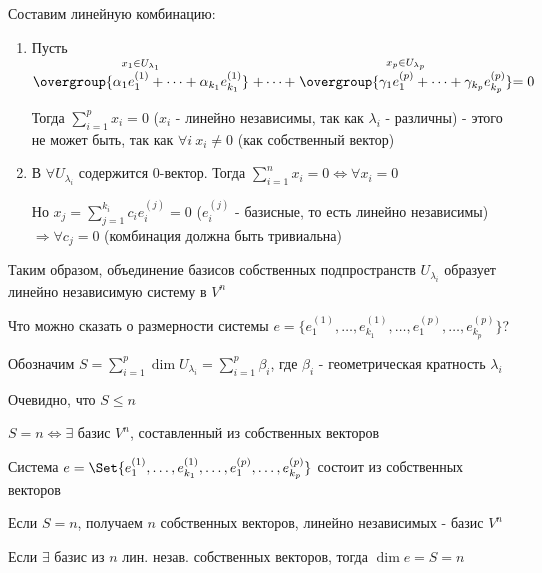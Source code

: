 \documentclass[12pt]{article}
\begin{document}
    \begin{MyProof}
        Составим линейную комбинацию:

        \begin{enumerate}
            \item Пусть $\stackrel{x_1 \in U_{\lambda_1}}{\overgroup{\alpha_1 e^{(1)}_1 + \dots + \alpha_{k_1} e^{(1)}_{k_1}}} + \dots +
            \stackrel{x_p \in U_{\lambda_p}}{\overgroup{\gamma_1 e^{(p)}_1 + \dots + \gamma_{k_p} e^{(p)}_{k_p}}} = 0$

            Тогда $\sum_{i=1}^p x_i = 0$ ($x_i$ - линейно независимы, так как $\lambda_i$ - различны) - этого не может быть, так как $\forall i \ x_i \neq 0$ (как собственный вектор)

            \item В $\forall U_{\lambda_i}$ содержится $0$-вектор. Тогда $\sum_{i=1}^n x_i = 0 \Longleftrightarrow \forall x_i = 0$

            Но $x_j = \sum_{j=1}^{k_i} c_i e^{(j)}_i = 0$ ($e^{(j)}_i$ - базисные, то есть линейно независимы) $\Longrightarrow \forall c_j = 0$ (комбинация должна быть тривиальна)
        \end{enumerate}
    \end{MyProof}

    \Nota Таким образом, объединение базисов собственных подпространств $U_{\lambda_i}$ образует линейно независимую систему в $V^n$

    Что можно сказать о размерности системы $e = \{e^{(1)}_1, \dots, e^{(1)}_{k_1}, \dots, e^{(p)}_1, \dots, e^{(p)}_{k_p}\}$?

    Обозначим $S = \sum_{i=1}^p \dim U_{\lambda_i} = \sum_{i=1}^p \beta_i$, где $\beta_i$ - геометрическая кратность $\lambda_i$

    Очевидно, что $S \leq n$

    \begin{MyTheorem}
        \Ths $S = n \Longleftrightarrow \exists$ базис $V^n$, составленный из собственных векторов
    \end{MyTheorem}

    \begin{MyProof}
        Система $e = \Set{e^{(1)}_1, \dots, e^{(1)}_{k_1}, \dots, e^{(p)}_1, \dots, e^{(p)}_{k_p}}$ состоит из собственных векторов

        Если $S = n$, получаем $n$ собственных векторов, линейно независимых - базис $V^n$

        Если $\exists$ базис из $n$ лин. незав. собственных векторов, тогда $\dim e = S = n$
    \end{MyProof}
\end{document}
